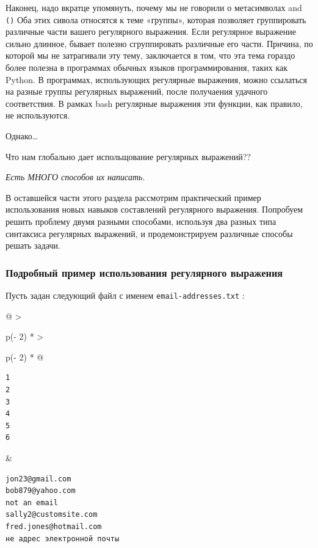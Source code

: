 \documentclass{article}
\begin{document}
Наконец, надо вкратце упомянуть, почему мы не говорили о метасимволах
\texttt{\textbar{}} and \texttt{()} Оба этих сивола относятся к теме
«группы», которая позволяет группировать различные части вашего
регулярного выражения. Если регулярное выражение сильно длинное, бывает
полезно сгруппировать различные его части. Причина, по которой мы не
затрагивали эту тему, заключается в том, что эта тема гораздо более
полезна в программах обычных языков программирования, таких как Python.
В программах, использующих регулярные выражения, можно ссылаться на
разные группы регулярных выражений, после получаения удачного
соответствия. В рамках bash регулярные выражения эти функции, как
правило, не используются.

Однако\ldots{}

Что нам глобально дает испольщование регулярных выражений??

\emph{Есть МНОГО способов их написать}.

В оставшейся части этого раздела рассмотрим практический пример
использования новых навыков составлений регулярного выражения. Попробуем
решить проблему двумя разными способами, используя два разных типа
синтаксиса регулярных выражений, и продемонстрируем различные способы
решать задачи.

\hypertarget{Detailed-Example-Regular-Expression}{%
\subsubsection{\texorpdfstring{\protect\hyperlink{Detailed-Example-Regular-Expression}{}Подробный
пример использования регулярного
выражения}{Подробный пример использования регулярного выражения}}\label{Detailed-Example-Regular-Expression}}

Пусть задан следующий файл с именем \texttt{email-addresses.txt} :

\begin{longtable}[]{@{}
  >{\raggedright\arraybackslash}p{(\columnwidth - 2\tabcolsep) * }
  >{\raggedright\arraybackslash}p{(\columnwidth - 2\tabcolsep) * }@{}}
\toprule
\endhead
\begin{minipage}[t]{\linewidth}\raggedright
\begin{verbatim}
1
2
3
4
5
6
\end{verbatim}
\end{minipage} & \begin{minipage}[t]{\linewidth}\raggedright
\begin{verbatim}
jon23@gmail.com
bob879@yahoo.com
not an email
sally2@customsite.com
fred.jones@hotmail.com
не адрес электронной почты
\end{verbatim}
\end{minipage} \\ \addlinespace
\bottomrule
\end{longtable}
\end{document}
